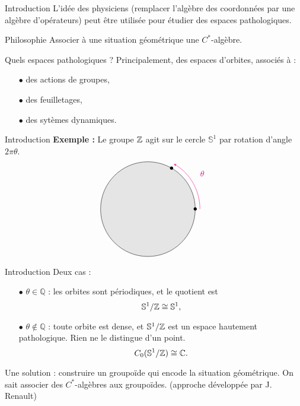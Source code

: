 \begin{frame}{Introduction}
L'idée des physiciens (remplacer l'algèbre des coordonnées par une algèbre d'opérateurs) peut être utilisée pour étudier des espaces pathologiques.
\vspace{0.3 cm}
\begin{block}{Philosophie}
Associer à une situation géométrique une $C^*$-algèbre.
\end{block}
\vspace{0.3 cm}
Quels espaces pathologiques ? Principalement, des espaces d'orbites, associés à :
\begin{itemize}
\item[$\bullet$] des actions de groupes,
\item[$\bullet$] des feuilletages,
\item[$\bullet$] des sytèmes dynamiques.
\end{itemize} 
\end{frame}

\begin{frame}{Introduction}
\textbf{Exemple :} Le groupe $\mathbb Z$ agit sur le cercle $\mathbb S^1$ par rotation d'angle $2\pi\theta$.
\vspace{0.3 cm}
\[\begin{tikzpicture}
\draw[fill = gray!20] (0,0) circle (2) ;
\draw [>=stealth, ->, magenta] (2.2,0)  arc (0:60:2.2); %
\draw[magenta]  (2.3,1.5) node {$\theta$};
\draw  (2,0) node {$\bullet$};
\draw  (1,1.72) node {$\bullet$};
\end{tikzpicture}\]
\end{frame}

\begin{frame}{Introduction}
Deux cas :
\vspace{0.3 cm}
\begin{itemize}
\item[$\bullet$] $\theta\in \mathbb Q$ : les orbites sont périodiques, et le quotient est 
\[\mathbb S^1 / \mathbb Z \cong \mathbb S^1,\] 
\item[$\bullet$] $\theta \notin \mathbb Q$ : toute orbite est dense, et  $\mathbb S^1 / \mathbb Z$ est un espace hautement pathologique. Rien ne le distingue d'un point.
 \[C_0(\mathbb S^1 / \mathbb Z) \cong \mathbb C.\]
\end{itemize}
\vspace{0.3 cm}
Une solution : construire un groupoïde qui encode la situation géométrique. On sait associer des $C^*$-algèbres aux groupoïdes. (approche développée par J. Renault)\\
\end{frame}

